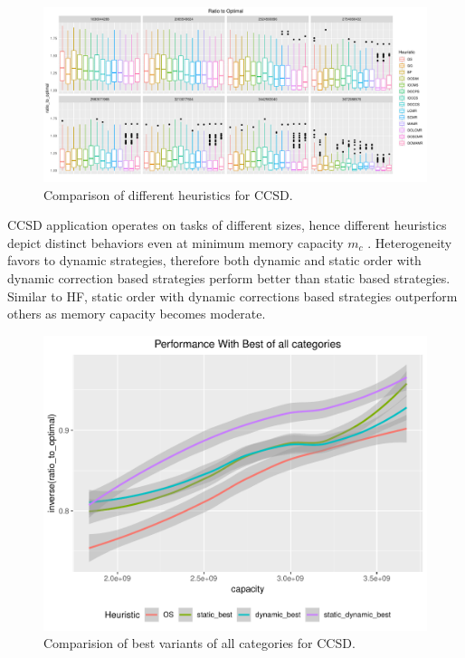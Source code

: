 \documentclass[sigconf]{acmart}
\begin{document}
{		\begin{figure}[htb]
			\includegraphics[scale=0.5]{./all-binpack/ratio_to_optimal_selected_ccsd.pdf}
			\caption{Comparison of different heuristics for CCSD.}
			\label{fig:ratio_to_optimal_ccsd}
		\end{figure}	
		
		CCSD application operates on tasks of different sizes, hence different heuristics depict distinct behaviors even at minimum memory capacity $m_c$ . Heterogeneity favors to dynamic strategies, therefore both dynamic and static order with dynamic correction based strategies perform better than static based strategies. Similar to HF, static order with dynamic corrections based strategies outperform others as memory capacity becomes moderate. 
		
		
		\begin{figure}[htb]
			\includegraphics[scale=0.5]{./results/plots/inverse_ratio_to_optimal_ccsd-best.pdf}
			\caption{Comparision of best variants of all categories for CCSD.}
			\label{fig:ratio_to_optimal_best_ccsd}
		\end{figure}
		
}
\end{document}
